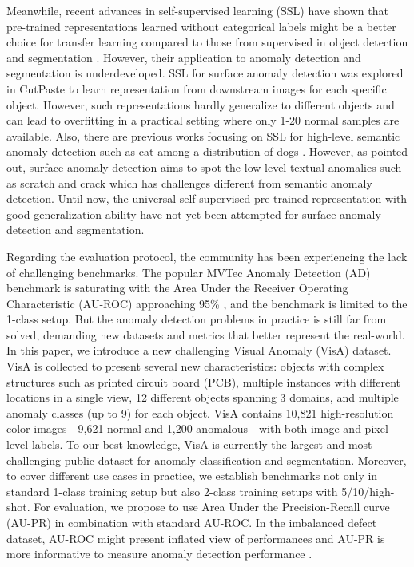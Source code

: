 \documentclass[runningheads]{llncs}
\begin{document}
Meanwhile, recent advances in self-supervised learning (SSL) have shown that pre-trained representations learned without categorical labels might be a better choice for transfer learning compared to those from supervised in object detection and segmentation \cite{chen2020simple,chen2021exploring,he2020momentum}. However, their application to anomaly detection and segmentation is underdeveloped. SSL for surface anomaly detection was explored in CutPaste \cite{li2021cutpaste} to learn representation from downstream images for each specific object. However, such representations hardly generalize to different objects and can lead to overfitting in a practical setting where only 1-20 normal samples are available. Also, there are previous works focusing on SSL for high-level semantic anomaly detection such as cat among a distribution of dogs \cite{cook2020consult,davis2006relationship,saito2015precision}. However, as \cite{ruff2021unifying} pointed out, surface anomaly detection aims to spot the low-level textual anomalies such as scratch and crack which has challenges different from semantic anomaly detection. Until now, the universal self-supervised pre-trained representation with good generalization ability have not yet been attempted for surface anomaly detection and segmentation.

Regarding the evaluation protocol, the community has been experiencing the lack of challenging benchmarks. The popular MVTec Anomaly Detection (AD) benchmark \cite{bergmann2021mvtec} is  saturating with the Area Under the Receiver Operating Characteristic (AU-ROC) approaching 95\% \cite{defard2021padim,li2021cutpaste}, and the benchmark is limited to the 1-class setup. But the anomaly detection problems in practice is still far from solved, demanding new datasets and metrics that better represent the real-world. In this paper, we introduce a new challenging Visual Anomaly (VisA) dataset. VisA is collected to present several new characteristics: objects with complex structures such as printed circuit board (PCB), multiple instances with different locations in a single view, 12 different objects spanning 3 domains, and multiple anomaly classes (up to 9) for each object. VisA contains 10,821 high-resolution color images - 9,621 normal and 1,200 anomalous - with both image and pixel-level labels. To our best knowledge, VisA is currently the largest and most challenging public dataset for anomaly classification and segmentation. Moreover, to cover different use cases in practice, we establish benchmarks not only in standard 1-class training setup but also 2-class training setups with 5/10/high-shot. For evaluation, we propose to use Area Under the Precision-Recall curve (AU-PR) in combination with standard AU-ROC. In the imbalanced defect dataset, AU-ROC might present inflated view of performances and AU-PR is more informative to measure anomaly detection performance \cite{cook2020consult,davis2006relationship,saito2015precision}.
\end{document}
